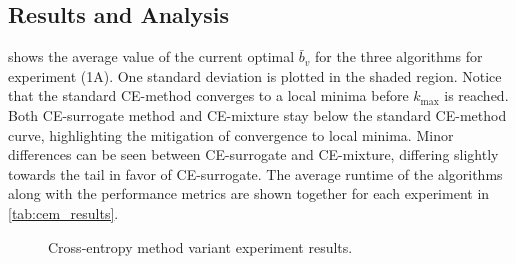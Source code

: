 \subsection{Results and Analysis} \label{sec:cem_results}


 shows the average value of the current optimal $\bar{b}_v$ for the three algorithms for experiment (1A). 
One standard deviation is plotted in the shaded region.
Notice that the standard CE-method converges to a local minima before $k_\text{max}$ is reached.
Both CE-surrogate method and CE-mixture stay below the standard CE-method curve, highlighting the mitigation of convergence to local minima.
Minor differences can be seen between CE-surrogate and CE-mixture, differing slightly towards the tail in favor of CE-surrogate.
The average runtime of the algorithms along with the performance metrics are shown together for each experiment in \cref{tab:cem_results}.

\begin{figure*}[ht]
    \centering
    \hspace{2mm}
    \hspace{2mm}
    \caption{Cross-entropy method variant experiment results.}\label{fig:cem_experiments}
\end{figure*}


